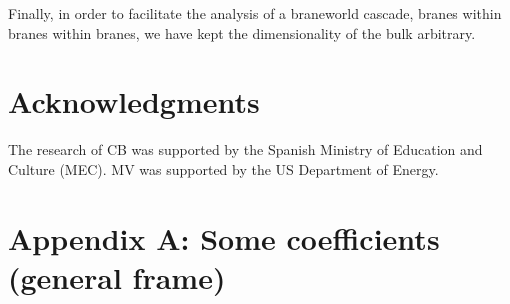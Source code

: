 \documentclass[a4paper,10pt]{article}
\renewcommand{\theequation}{\arabic{section}.\arabic{equation}}
\begin{document}
{Finally, in order to facilitate the analysis of a braneworld cascade,
branes within branes within branes, we have kept the dimensionality
of the bulk arbitrary.



\section*{Acknowledgments}
The research of CB was supported by the Spanish Ministry of Education
and Culture (MEC). MV was supported by the US Department of Energy.

\appendix
\section*{Appendix A: Some coefficients (general frame)}
\label{S:coefficents}
\setcounter{equation}{0}
\renewcommand{\theequation}{A.\arabic{equation}}

}
\end{document}

